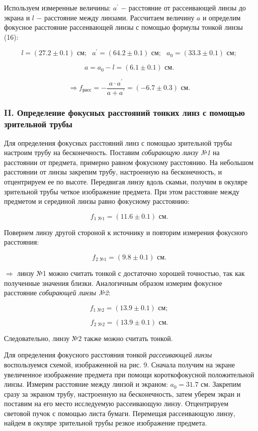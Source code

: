 \documentclass[a4paper,12pt]{article} %
\begin{document}
\hfill \break Используем измеренные величины: $a^\prime$ $-$ расстояние от рассеивающей линзы до экрана и $l$ $-$ расстояние между линзами. Рассчитаем величину $a$ и определим фокусное расстояние рассеивающей линзы с помощью формулы тонкой линзы (16):

$$
l = (27.2 \pm 0.1) \text{ см}; \text{ } a^\prime = (64.2 \pm 0.1) \text{ см}; \text{ } a_{0} = (33.3 \pm 0.1) \text{ см};
$$

$$
a = a_{0} - l = (6.1 \pm 0.1) \text{ см}.
$$

$$
\Rightarrow f_{\text{расс}} = - \frac {a \cdot a^\prime} {a + a^\prime} = (-6.7 \pm 0.3) \text{ см}.
$$

\subsubsection*{II. Определение фокусных расстояний тонких линз с помощью зрительной трубы}
\hfill \break Для определения фокусных расстояний линз с помощью зрительной трубы настроим трубу на бесконечность. Поставим \textit{собирающую линзу №1} на расстоянии от предмета, примерно равном фокусному расстоянию. На небольшом расстоянии от линзы закрепим трубу, настроенную на бесконечность, и отцентрируем ее по высоте. Передвигая линзу вдоль скамьи, получим в окуляре зрительной трубы четкое изображение предмета. При этом расстояние между предметом и серединой линзы равно фокусному расстоянию:

$$
f_{\text{1 №1}} = (11.6 \pm 0.1) \text{ см}.
$$

\hfill \break Повернем линзу другой стороной к источнику и повторим измерения фокусного расстояния:

$$
f_{\text{2 №1}} = (9.8 \pm 0.1) \text{ см}.
$$

\hfill \break $\Rightarrow$ линзу №1 можно считать тонкой с достаточно хорошей точностью, так как полученные значения близки. Аналогичным образом измерим фокусное расстояние \textit{собирающей линзы №2}:

$$
f_{\text{1 №2}} = (13.9 \pm 0.1) \text{ см};
$$

$$
f_{\text{2 №2}} = (13.9 \pm 0.1) \text{ см}.
$$

\hfill \break Следовательно, линзу №2 также можно считать тонкой. 

\hfill \break Для определения фокусного расстояния тонкой \textit{рассеивающей линзы} воспользуемся схемой, изображенной на рис. 9. Сначала получим на экране увеличенное изображение предмета при помощи короткофокусной положительной линзы. Измерим расстояние между линзой и экраном: $a_{0} = 31.7$ см. Закрепим сразу за экраном трубу, настроенную на бесконечность, затем уберем экран и поставим на его место исследуемую рассеивающую линзу. Отцентрируем световой пучок с помощью листа бумаги. Перемещая рассеивающую линзу, найдем в окуляре зрительной трубы резкое изображение предмета. 
\end{document}
